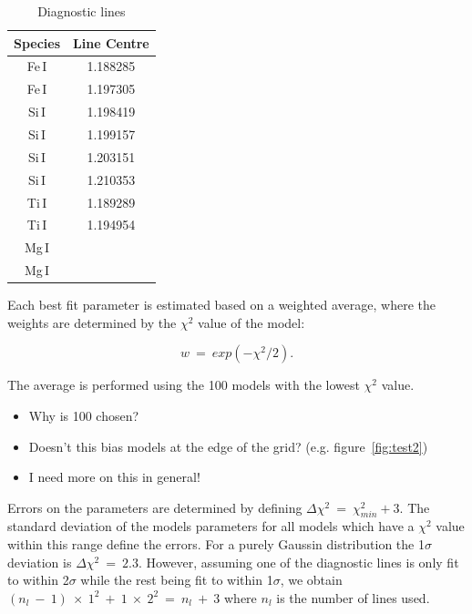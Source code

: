 \begin{table}
\caption[Diagnostic lines]{Diagnostic lines\label{tb:lines}}
\scriptsize
\begin{center}
\begin{tabular}{cc}
 \hline
 \hline
Species & Line Centre \\
 \hline
Fe\,I & 1.188285 \\
Fe\,I & 1.197305 \\
Si\,I & 1.198419 \\
Si\,I & 1.199157 \\
Si\,I & 1.203151 \\
Si\,I & 1.210353 \\
Ti\,I & 1.189289 \\
Ti\,I & 1.194954 \\
Mg\,I & \\
Mg\,I & \\
 \hline
\end{tabular}
\end{center}
\end{table}

Each best fit parameter is estimated based on a weighted average,
where the weights are determined by the $\chi^{2}$ value of the model:

\begin{equation}
    w~=~exp(-\chi^{2}/2).
\end{equation}

The average is performed using the 100 models with the lowest $\chi^{2}$ value.
\begin{itemize}
    \item Why is 100 chosen?
    \item Doesn't this bias models at the edge of the grid? (e.g. figure~\ref{fig:test2})
    \item I need more on this in general!
\end{itemize}

Errors on the parameters are determined by defining
$\Delta\chi^{2}~=~\chi^{2}_{min} + 3$.
The standard deviation of the models parameters for all models which have a
$\chi^{2}$ value within this range define the errors.
For a purely Gaussin distribution the 1$\sigma$ deviation is $\Delta\chi^{2}~=~2.3$.
However, assuming one of the diagnostic lines is only fit to within 2$\sigma$ while the rest being fit to within 1$\sigma$, we obtain $(n_{l}~-~1)~\times~1^{2}~+~1~\times~2^{2}~=~n_{l}~+~3$
where $n_{l}$ is the number of lines used.

